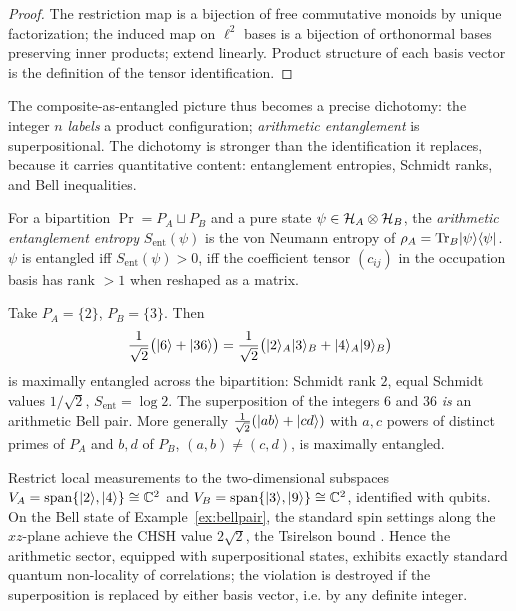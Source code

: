 \begin{proof}
The restriction map is a bijection of free commutative monoids by unique factorization; the
induced map on $\ell^{2}$ bases is a bijection of orthonormal bases preserving inner
products; extend linearly. Product structure of each basis vector is the definition of the
tensor identification.
\end{proof}

The composite-as-entangled picture thus becomes a precise dichotomy: the
integer $n$ \emph{labels} a product configuration; \emph{arithmetic entanglement} is
superpositional. The dichotomy is stronger than the identification it replaces, because it
carries
quantitative content: entanglement entropies, Schmidt ranks, and Bell
inequalities.

\begin{definition}\label{def:arithmeticent}
For a bipartition $\Pr=P_{A}\sqcup P_{B}$ and a pure state
$\psi\in\mathcal{H}_{A}\otimes\mathcal{H}_{B}$, the \emph{arithmetic entanglement entropy}
$S_{\mathrm{ent}}(\psi)$ is the von Neumann entropy of
$\rho_{A}=\operatorname{Tr}_{B}\lvert \psi\rangle\langle \psi\rvert$. $\psi$ is entangled iff
$S_{\mathrm{ent}}(\psi)>0$, iff the coefficient tensor
$(c_{ij})$ in the occupation basis has rank $>1$ when reshaped as a matrix.
\end{definition}

\begin{example}\label{ex:bellpair}
Take $P_{A}=\{2\}$, $P_{B}=\{3\}$. Then
\begin{equation}
\frac{1}{\sqrt2}\bigl(\lvert 6\rangle+\lvert 36\rangle\bigr)
=\frac{1}{\sqrt2}\bigl(\lvert 2\rangle_{A}\lvert 3\rangle_{B}+\lvert 4\rangle_{A}\lvert 9\rangle_{B}\bigr)
\end{equation}
is maximally entangled across the bipartition: Schmidt rank $2$, equal Schmidt values
$1/\sqrt2$, $S_{\mathrm{ent}}=\log2$. The superposition of the integers $6$ and $36$ \emph{is}
an arithmetic Bell pair. More generally
$\frac{1}{\sqrt2}(\lvert ab\rangle+\lvert cd\rangle)$ with $a,c$ powers of distinct primes of $P_{A}$ and
$b,d$ of $P_{B}$, $(a,b)\neq(c,d)$, is maximally entangled.
\end{example}

\begin{proposition}\label{prop:chsh}
Restrict local measurements to the two-dimensional subspaces
$V_{A}=\mathrm{span}\{\lvert 2\rangle,\lvert 4\rangle\}\cong\mathbb{C}^{2}$ and
$V_{B}=\mathrm{span}\{\lvert 3\rangle,\lvert 9\rangle\}\cong\mathbb{C}^{2}$, identified with qubits. On the Bell
state of Example~\ref{ex:bellpair}, the standard spin settings along the $xz$-plane achieve
the CHSH value $2\sqrt2$, the Tsirelson bound \cite{chsh1969,bell1964}. Hence the arithmetic
sector, equipped with superpositional states, exhibits exactly standard quantum
non-locality of correlations; the violation is destroyed if the superposition is replaced by
either basis vector, i.e. by any definite integer.
\end{proposition}

